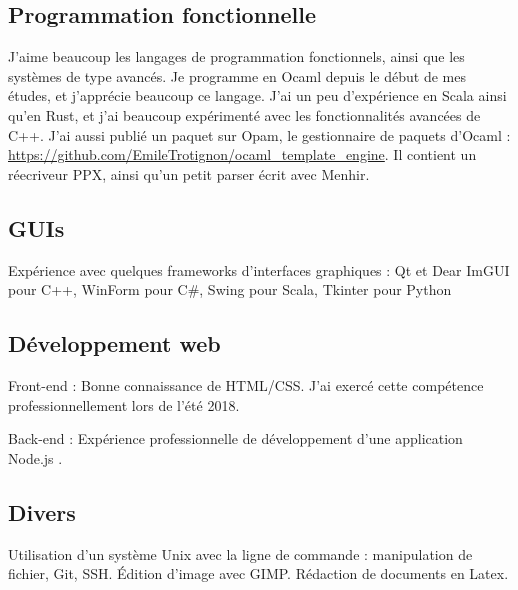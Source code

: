 \documentclass[10pt, a4paper, roman, french]{moderncv}
\begin{document}
		\subsection{Programmation fonctionnelle}
			J'aime beaucoup les langages de programmation fonctionnels, ainsi que les systèmes de type avancés. Je programme en Ocaml depuis le début de mes études, et j'apprécie beaucoup ce langage. J'ai un peu d'expérience en Scala ainsi qu'en Rust, et j'ai beaucoup expérimenté avec les fonctionnalités avancées de C++.
J'ai aussi publié un paquet sur Opam, le gestionnaire de paquets d'Ocaml : \url{https://github.com/EmileTrotignon/ocaml_template_engine}.
Il contient un réecriveur PPX, ainsi qu'un petit parser écrit avec Menhir.
	
		\subsection{GUIs}
			Expérience avec quelques frameworks d'interfaces graphiques :
Qt et Dear ImGUI pour C++, WinForm pour C\#, Swing pour Scala, Tkinter pour Python
	
		\subsection{Développement web}
			Front-end : Bonne connaissance de HTML/CSS. J'ai exercé cette compétence professionnellement lors de l'été 2018.

Back-end : Expérience professionnelle de développement d'une application Node.js .
	
		\subsection{Divers}
			Utilisation d'un système Unix avec la ligne de commande : manipulation de fichier, Git, SSH.
Édition d'image avec GIMP.
Rédaction de documents en Latex. 
	
\end{document}
